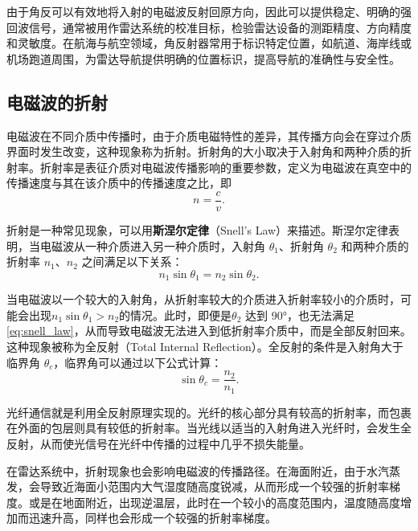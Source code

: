 由于角反可以有效地将入射的电磁波反射回原方向，因此可以提供稳定、明确的强回波信号，通常被用作雷达系统的校准目标，检验雷达设备的测距精度、方向精度和灵敏度。在航海与航空领域，角反射器常用于标识特定位置，如航道、海岸线或机场跑道周围，为雷达导航提供明确的位置标识，提高导航的准确性与安全性。



\subsection{电磁波的折射}

电磁波在不同介质中传播时，由于介质电磁特性的差异，其传播方向会在穿过介质界面时发生改变，这种现象称为折射。折射角的大小取决于入射角和两种介质的折射率。折射率是表征介质对电磁波传播影响的重要参数，定义为电磁波在真空中的传播速度与其在该介质中的传播速度之比，即
\begin{equation}
    n = \frac{c}{v}.
    \label{eq:refraction_index}
\end{equation}

折射是一种常见现象，可以用\textbf{斯涅尔定律}（Snell's Law）来描述。斯涅尔定律表明，当电磁波从一种介质进入另一种介质时，入射角 $\theta_1$、折射角 $\theta_2$ 和两种介质的折射率 $n_1$、$n_2$ 之间满足以下关系：
\begin{equation}
    n_1 \sin \theta_1 = n_2 \sin \theta_2.
    \label{eq:snell_law}
\end{equation}

当电磁波以一个较大的入射角，从折射率较大的介质进入折射率较小的介质时，可能会出现\( n_1 \sin \theta_1 > n_2 \)的情况。此时，即便是\( \theta_2 \) 达到 90°，也无法满足\cref{eq:snell_law}，从而导致电磁波无法进入到低折射率介质中，而是全部反射回来。这种现象被称为全反射（Total Internal Reflection）。全反射的条件是入射角大于临界角 $\theta_c$，临界角可以通过以下公式计算：
\begin{equation}
    \sin \theta_c = \frac{n_2}{n_1}.
    \label{eq:critical_angle}
\end{equation}

光纤通信就是利用全反射原理实现的。光纤的核心部分具有较高的折射率，而包裹在外面的包层则具有较低的折射率。当光线以适当的入射角进入光纤时，会发生全反射，从而使光信号在光纤中传播的过程中几乎不损失能量。

在雷达系统中，折射现象也会影响电磁波的传播路径。在海面附近，由于水汽蒸发，会导致近海面小范围内大气湿度随高度锐减，从而形成一个较强的折射率梯度。或是在地面附近，出现逆温层，此时在一个较小的高度范围内，温度随高度增加而迅速升高，同样也会形成一个较强的折射率梯度。

